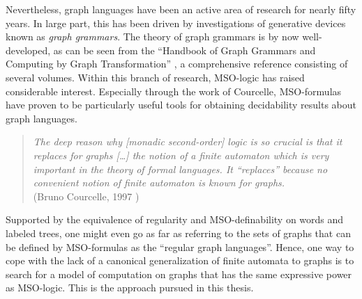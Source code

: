 \documentclass[a4paper,11pt,twoside]{report} \pdfoutput=1
\begin{document}
Nevertheless, graph languages have been an active area of research for
nearly fifty years. In large part, this has been driven by
investigations of generative devices known as \emph{graph grammars}.
The theory of graph grammars is by now well-developed, as can be seen
from the “Handbook of Graph Grammars and Computing by Graph
Transformation” \cite{HGG97-99}, a comprehensive reference consisting
of several volumes. Within this branch of research, MSO-logic has
raised considerable interest. Especially through the work of
Courcelle, MSO-formulas have proven to be particularly useful tools
for obtaining decidability results about graph languages.

\begin{quote}
  \emph{The deep reason why \emph{[monadic second-order]} logic is so
    crucial is that it replaces for graphs \emph{[…\!]} the notion of
    a finite automaton which is very important in the theory of formal
    languages. It “replaces” because no convenient notion of finite
    automaton is known for graphs.} \\
  \hspace*{\fill} (Bruno Courcelle, 1997 \cite[p.~315]{Cou97})
\end{quote}

Supported by the equivalence of regularity and MSO-definability on
words and labeled trees, one might even go as far as referring to the
sets of graphs that can be defined by MSO-formulas as the “regular
graph languages”. Hence, one way to cope with the lack of a canonical
generalization of finite automata to graphs is to search for a model
of computation on graphs that has the same expressive power as
MSO-logic. This is the approach pursued in this thesis.
\end{document}
